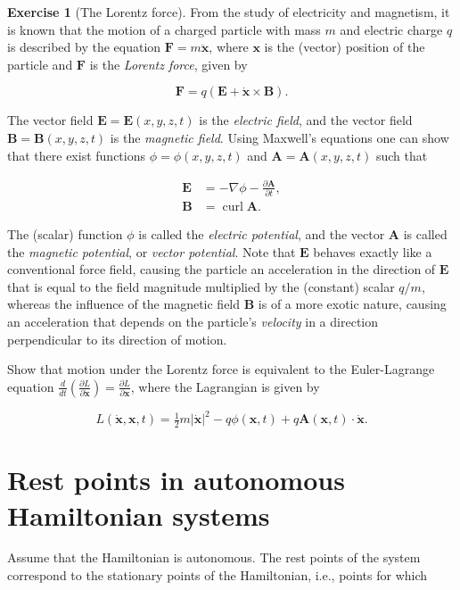 \documentclass[11pt]{report}
\theoremstyle{plain}
\theoremstyle{definition}
\newtheorem{xexercise}[thm]{Exercise}
\begin{document}
\begin{xexercise}[The Lorentz force]
From the study of electricity and magnetism, it is
known that the motion of a charged particle with mass
$m$ and electric charge $q$ is described by the
equation $\mathbf{F}=m \ddot{\mathbf{x}}$, where
$\mathbf{x}$ is the (vector) position of the particle
and $\mathbf{F}$ is the \emph{Lorentz force}, given by

\[
\mathbf{F} = q\left(\mathbf{E} + \dot{\mathbf{x}}\times \mathbf{B}\right).
\]

The vector field $\mathbf{E}=\mathbf{E}(x,y,z,t)$ is
the \emph{electric field}, and the vector field
$\mathbf{B}=\mathbf{B}(x,y,z,t)$ is the \emph{magnetic
field}. Using Maxwell's equations one can show that
there exist functions $\phi=\phi(x,y,z,t)$ and
$\mathbf{A}=\mathbf{A}(x,y,z,t)$ such that

\begin{align*}
\mathbf{E} &= - \nabla \phi - \frac{\partial \mathbf{A}}{\partial t}, \\
\mathbf{B} &= \operatorname{curl} \mathbf{A}.
\end{align*}

The (scalar) function $\phi$ is called the \emph{electric
potential}, and the vector $\mathbf{A}$ is called the
\emph{magnetic potential}, or \emph{vector potential}. Note that
$\mathbf{E}$ behaves exactly like a conventional
force field, causing the particle an acceleration in
the direction of $\mathbf{E}$ that is equal to the
field magnitude multiplied by the (constant) scalar
$q/m$, whereas the influence of the magnetic field
$\mathbf{B}$ is of a more exotic nature, causing an
acceleration that depends on the particle's \emph{velocity}
in a direction perpendicular to its direction of
motion.

Show that motion under the Lorentz force is
equivalent to the Euler-Lagrange equation
$\frac{d}{dt}\left(\frac{\partial L}{\partial
\dot{\mathbf{x}}}\right)=\frac{\partial L}{\partial
\mathbf{x}}$,
where the Lagrangian is given by

\[
L(\dot{\mathbf{x}},\mathbf{x},t) = \tfrac12 m |\dot{\mathbf{x}}|^2 - q \phi(\mathbf{x},t) +q \mathbf{A}(\mathbf{x},t)\cdot \dot{\mathbf{x}}.
\]

\end{xexercise}

\section{Rest points in autonomous Hamiltonian systems}
Assume that the Hamiltonian is autonomous. The rest
points of the system correspond to the stationary
points of the Hamiltonian, i.e., points for which
\end{document}
